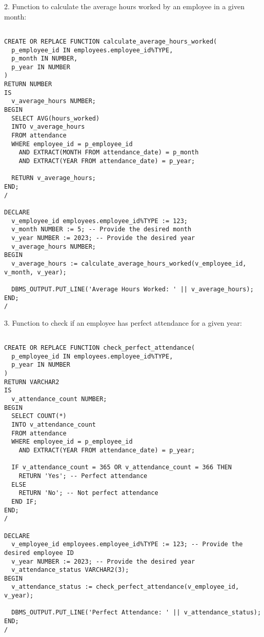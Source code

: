 \documentclass[11pt]{article} %
\begin{document}
2. Function to calculate the average hours worked by an employee in a given month:

\begin{small}
\begin{verbatim}

CREATE OR REPLACE FUNCTION calculate_average_hours_worked(
  p_employee_id IN employees.employee_id%TYPE,
  p_month IN NUMBER,
  p_year IN NUMBER
)
RETURN NUMBER
IS
  v_average_hours NUMBER;
BEGIN
  SELECT AVG(hours_worked)
  INTO v_average_hours
  FROM attendance
  WHERE employee_id = p_employee_id
    AND EXTRACT(MONTH FROM attendance_date) = p_month
    AND EXTRACT(YEAR FROM attendance_date) = p_year;
    
  RETURN v_average_hours;
END;
/

DECLARE
  v_employee_id employees.employee_id%TYPE := 123;
  v_month NUMBER := 5; -- Provide the desired month
  v_year NUMBER := 2023; -- Provide the desired year
  v_average_hours NUMBER;
BEGIN
  v_average_hours := calculate_average_hours_worked(v_employee_id, v_month, v_year);
  
  DBMS_OUTPUT.PUT_LINE('Average Hours Worked: ' || v_average_hours);
END;
/

\end{verbatim}
\end{small}

3. Function to check if an employee has perfect attendance for a given year:

\begin{small}
\begin{verbatim}

CREATE OR REPLACE FUNCTION check_perfect_attendance(
  p_employee_id IN employees.employee_id%TYPE,
  p_year IN NUMBER
)
RETURN VARCHAR2
IS
  v_attendance_count NUMBER;
BEGIN
  SELECT COUNT(*)
  INTO v_attendance_count
  FROM attendance
  WHERE employee_id = p_employee_id
    AND EXTRACT(YEAR FROM attendance_date) = p_year;
    
  IF v_attendance_count = 365 OR v_attendance_count = 366 THEN
    RETURN 'Yes'; -- Perfect attendance
  ELSE
    RETURN 'No'; -- Not perfect attendance
  END IF;
END;
/

DECLARE
  v_employee_id employees.employee_id%TYPE := 123; -- Provide the desired employee ID
  v_year NUMBER := 2023; -- Provide the desired year
  v_attendance_status VARCHAR2(3);
BEGIN
  v_attendance_status := check_perfect_attendance(v_employee_id, v_year);
  
  DBMS_OUTPUT.PUT_LINE('Perfect Attendance: ' || v_attendance_status);
END;
/

\end{verbatim}
\end{small}
\end{document}
